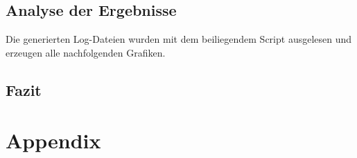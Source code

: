 \documentclass[12pt, a4paper]{scrartcl}
\begin{document}
\subsection{Analyse der Ergebnisse}
Die generierten Log-Dateien wurden mit dem beiliegendem Script ausgelesen und erzeugen alle nachfolgenden Grafiken.
\subsection{Fazit}

\newpage
\renewcommand{\thesubsection}{\Alph{subsection}}
\setcounter{page}{\value{lastroman}}
\section*{Appendix}


\end{document}
